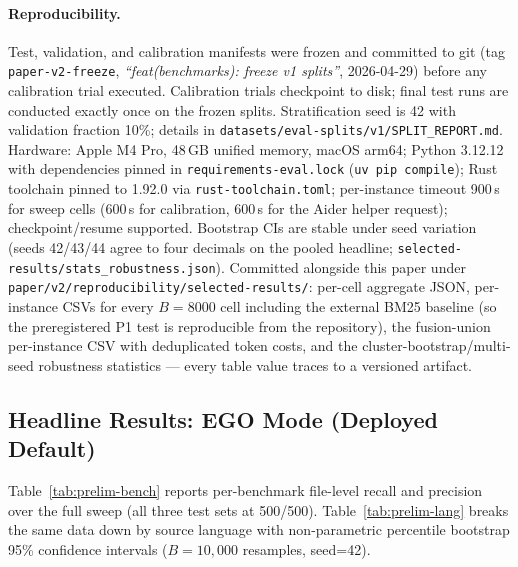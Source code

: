 \documentclass[11pt, a4paper]{article}
\begin{document}
\paragraph{Reproducibility.} Test, validation, and calibration manifests were frozen and committed to git (tag \texttt{paper-v2-freeze}, \emph{``feat(benchmarks): freeze v1 splits''}, 2026-04-29) before any calibration trial executed. Calibration trials checkpoint to disk; final test runs are conducted exactly once on the frozen splits. Stratification seed is 42 with validation fraction 10\%; details in \texttt{datasets/eval-splits/v1/SPLIT\_REPORT.md}. Hardware: Apple M4 Pro, 48\,GB unified memory, macOS arm64; Python 3.12.12 with dependencies pinned in \texttt{requirements-eval.lock} (\texttt{uv pip compile}); Rust toolchain pinned to 1.92.0 via \texttt{rust-toolchain.toml}; per-instance timeout 900\,s for sweep cells (600\,s for calibration, 600\,s for the Aider helper request); checkpoint/resume supported. Bootstrap CIs are stable under seed variation (seeds 42/43/44 agree to four decimals on the pooled headline; \texttt{selected-results/stats\_robustness.json}). Committed alongside this paper under \texttt{paper/v2/reproducibility/selected-results/}: per-cell aggregate JSON, per-instance CSVs for every $B{=}8000$ cell including the external BM25 baseline (so the preregistered P1 test is reproducible from the repository), the fusion-union per-instance CSV with deduplicated token costs, and the cluster-bootstrap/multi-seed robustness statistics --- every table value traces to a versioned artifact.

\subsection{Headline Results: EGO Mode (Deployed Default)}

Table~\ref{tab:prelim-bench} reports per-benchmark file-level recall and precision over the full sweep (all three test sets at 500/500). Table~\ref{tab:prelim-lang} breaks the same data down by source language with non-parametric percentile bootstrap 95\% confidence intervals ($B{=}10{,}000$ resamples, seed=42).
\end{document}
